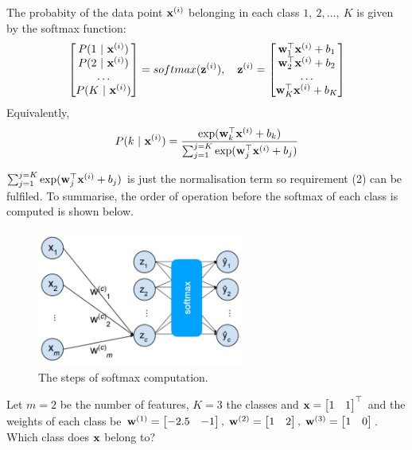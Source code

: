 \documentclass[a4paper]{article}
\begin{document}
\begin{corollary}
The probabity of the data point $\textbf{x}^{(i)} $ belonging  in each class $1,\ 2, \ldots, \ K$ is given by the softmax function:
\begin{equation}
    \begin{bmatrix}
        P(1\ |\ \textbf{x}^{(i)}) \\
        P(2\ |\ \textbf{x}^{(i)}) \\
        \ldots \\
        P(K\ |\ \textbf{x}^{(i)}) \\
    \end{bmatrix} 
    = softmax(\textbf{z}^{(i)}), \quad \textbf{z}^{(i)} =
    \begin{bmatrix}
    \textbf{w}^{\top}_1 \textbf{x}^{(i)} + b_1 \\
    \textbf{w}^{\top}_2 \textbf{x}^{(i)} + b_2 \\
    \ldots \\
    \textbf{w}^{\top}_K \textbf{x}^{(i)} + b_K \\
    \end{bmatrix}
\end{equation}
Equivalently,
\begin{equation}
    P(k \ | \ \textbf{x}^{(i)}) = \frac{\exp(\textbf{w}^{\top}_k \textbf{x}^{(i)} + b_k)}
    {\sum_{j=1}^{j=K}{\exp(\textbf{w}^{\top}_j \textbf{x}^{(i)} + b_j})}
\end{equation}
\end{corollary}
$\sum_{j=1}^{j=K}{\exp(\textbf{w}^{\top}_j \textbf{x}^{(i)} + b_j})$ is just the normalisation term so requirement (2) can be fulfiled. To summarise, the order of operation before the softmax of each class is computed is shown below.
\begin{figure}[H]
    \centering
    \includegraphics[height=4.5cm]{img/softmax_neural_net.PNG}
    \caption{The steps of softmax computation.}
\end{figure}
\begin{exmp}
Let $m=2$ be the number of features, $K=3$ the classes and $\textbf{x}=\begin{bmatrix}1 & 1 \end{bmatrix}^\top$ and the weights of each class be $\textbf{w}^{(1)}=\begin{bmatrix}-2.5 & -1 \end{bmatrix}, \; \textbf{w}^{(2)}=\begin{bmatrix}1 & 2 \end{bmatrix}, \; \textbf{w}^{(3)}=\begin{bmatrix}1 & 0 \end{bmatrix}$. Which class does $\textbf{x}$ belong to?
\end{exmp}
\end{document}
